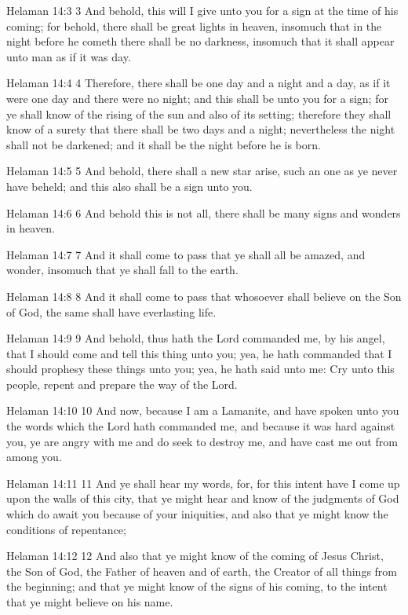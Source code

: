 Helaman 14:3
 3 And behold, this will I give unto you for a sign at the time
of his coming; for behold, there shall be great lights in heaven,
insomuch that in the night before he cometh there shall be no
darkness, insomuch that it shall appear unto man as if it was
day.

Helaman 14:4
 4 Therefore, there shall be one day and a night and a day, as if
it were one day and there were no night; and this shall be unto
you for a sign; for ye shall know of the rising of the sun and
also of its setting; therefore they shall know of a surety that
there shall be two days and a night; nevertheless the night shall
not be darkened; and it shall be the night before he is born.

Helaman 14:5
 5 And behold, there shall a new star arise, such an one as ye
never have beheld; and this also shall be a sign unto you.

Helaman 14:6
 6 And behold this is not all, there shall be many signs and
wonders in heaven.

Helaman 14:7
 7 And it shall come to pass that ye shall all be amazed, and
wonder, insomuch that ye shall fall to the earth.

Helaman 14:8
 8 And it shall come to pass that whosoever shall believe on the
Son of God, the same shall have everlasting life.

Helaman 14:9
 9 And behold, thus hath the Lord commanded me, by his angel,
that I should come and tell this thing unto you; yea, he hath
commanded that I should prophesy these things unto you; yea, he
hath said unto me: Cry unto this people, repent and prepare the
way of the Lord.

Helaman 14:10
 10 And now, because I am a Lamanite, and have spoken unto you
the words which the Lord hath commanded me, and because it was
hard against you, ye are angry with me and do seek to destroy me,
and have cast me out from among you.

Helaman 14:11
 11 And ye shall hear my words, for, for this intent have I come
up upon the walls of this city, that ye might hear and know of
the judgments of God which do await you because of your
iniquities, and also that ye might know the conditions of
repentance;

Helaman 14:12
 12 And also that ye might know of the coming of Jesus Christ,
the Son of God, the Father of heaven and of earth, the Creator of
all things from the beginning; and that ye might know of the
signs of his coming, to the intent that ye might believe on his
name.

